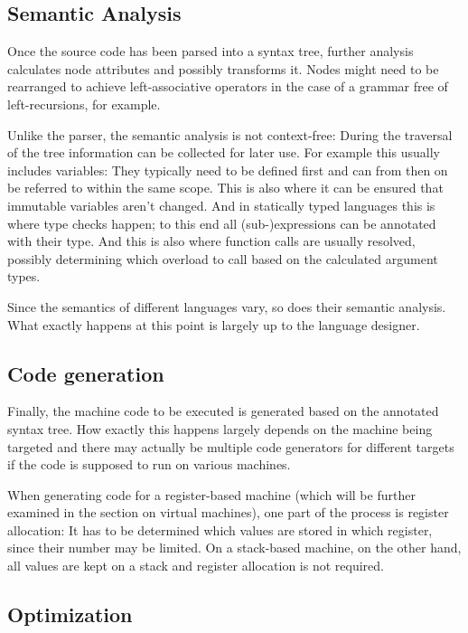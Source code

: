 		\subsection{Semantic Analysis}
		
		Once the source code has been parsed into a syntax tree, further analysis calculates node attributes and possibly transforms it. Nodes might need to be rearranged to achieve left-associative operators in the case of a grammar free of left-recursions, for example.
		
		Unlike the parser, the semantic analysis is not context-free: During the traversal of the tree information can be collected for later use. For example this usually includes variables: They typically need to be defined first and can from then on be referred to within the same scope. This is also where it can be ensured that immutable variables aren't changed. And in statically typed languages this is where type checks happen; to this end all (sub-)expressions can be annotated with their type. And this is also where function calls are usually resolved, possibly determining which overload to call based on the calculated argument types.
		
		Since the semantics of different languages vary, so does their semantic analysis. What exactly happens at this point is largely up to the language designer.
		
		
		\subsection{Code generation}
		
		Finally, the machine code to be executed is generated based on the annotated syntax tree. How exactly this happens largely depends on the machine being targeted and there may actually be multiple code generators for different targets if the code is supposed to run on various machines.
		
		When generating code for a register-based machine (which will be further examined in the section on virtual machines), one part of the process is register allocation: It has to be determined which values are stored in which register, since their number may be limited. On a stack-based machine, on the other hand, all values are kept on a stack and register allocation is not required.
		
		\subsection{Optimization}
		
